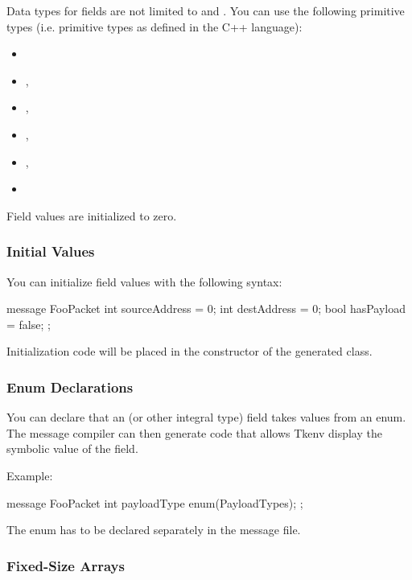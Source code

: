 Data types for fields are not limited to  and
. You can use the following primitive types (i.e. primitive
types as defined in the C++ language):

\begin{itemize}
   \item {}
   \item {}, 
   \item {}, 
   \item {}, 
   \item {}, 
   \item {}
\end{itemize}

Field values are initialized to zero.


\subsubsection{Initial Values}

You can initialize field values with the following syntax:

\begin{msg}
message FooPacket
{
    int sourceAddress = 0;
    int destAddress = 0;
    bool hasPayload = false;
};
\end{msg}

Initialization code will be placed in the constructor of the generated class.


\subsubsection{Enum Declarations}

You can declare that an  (or other integral type) field
takes values from an enum. The message compiler can then generate code
that allows Tkenv display the symbolic value of the field.

Example:

\begin{msg}
message FooPacket
{
    int payloadType enum(PayloadTypes);
};
\end{msg}

The enum has to be declared separately in the message file.


\subsubsection{Fixed-Size Arrays}

